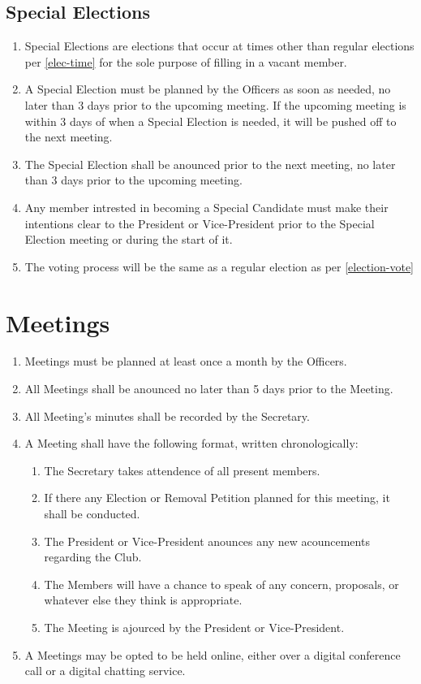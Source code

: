 \documentclass[a4paper,12pt]{article}
\begin{document}
\subsection{Special Elections} \label{special-election}
\begin{enumerate}
  \item Special Elections are elections that occur at times other than regular elections per \cref{elec-time} for the sole purpose of filling in a vacant member.
  \item A Special Election must be planned by the Officers as soon as needed, no later than 3 days prior to the upcoming meeting. If the upcoming meeting is within 3 days of when a Special Election is needed, it will be pushed off to the next meeting.
  \item The Special Election shall be anounced prior to the next meeting, no later than 3 days prior to the upcoming meeting.
  \item Any member intrested in becoming a Special Candidate must make their intentions clear to the President or Vice-President prior to the Special Election meeting or during the start of it.
  \item The voting process will be the same as a regular election as per \cref{election-vote}
\end{enumerate}

\section{Meetings}
\begin{enumerate}[label=\thesection.\arabic*.]
  \item Meetings must be planned at least once a month by the Officers.
  \item All Meetings shall be anounced no later than 5 days prior to the Meeting.
  \item All Meeting's minutes shall be recorded by the Secretary.
  \item A Meeting shall have the following format, written chronologically:
  \begin{enumerate}
    \item The Secretary takes attendence of all present members.
    \item If there any Election or Removal Petition planned for this meeting, it shall be conducted.
    \item The President or Vice-President anounces any new acouncements regarding the Club.
    \item The Members will have a chance to speak of any concern, proposals, or whatever else they think is appropriate.
    \item The Meeting is ajourced by the President or Vice-President.
  \end{enumerate}
  \item A Meetings may be opted to be held online, either over a digital conference call or a digital chatting service.
\end{enumerate}
\end{document}
